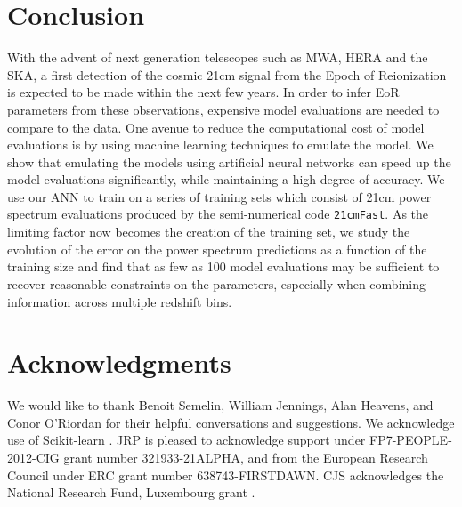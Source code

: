 \documentclass[useAMS,usenatbib]{mnras}
\begin{document}
\section{Conclusion}
\label{sec: conclusion}
With the advent of next generation telescopes such as MWA, HERA and the SKA, a first detection of the cosmic 21cm signal from the Epoch of Reionization is expected to be made within the next few years.
In order to infer EoR parameters from these observations, expensive model evaluations are needed to compare to the data.
One avenue to reduce the computational cost of model evaluations is by using machine learning techniques to emulate the model.
We show that emulating the models using artificial neural networks can speed up the model evaluations significantly, while maintaining a high degree of accuracy.
We use our ANN to train on a series of training sets which consist of 21cm power spectrum evaluations produced by the semi-numerical code \texttt{21cmFast}.
As the limiting factor now becomes the creation of the training set, we study the evolution of the error on the power spectrum predictions as a function of the training size and find that as few as 100 model evaluations may be sufficient to recover reasonable constraints on the parameters, especially when combining information across multiple redshift bins.









\section*{Acknowledgments}

We would like to thank Benoit Semelin, William Jennings, Alan Heavens, and Conor O'Riordan for their helpful conversations and suggestions.
We acknowledge use of Scikit-learn \citep{scikit-learn}.
JRP is pleased to acknowledge support under FP7-PEOPLE-2012-CIG grant number 321933-21ALPHA, and from the European Research Council under ERC grant number 638743-FIRSTDAWN.
CJS acknowledges the National Research
Fund, Luxembourg grant .




 

\label{lastpage}
\end{document}
